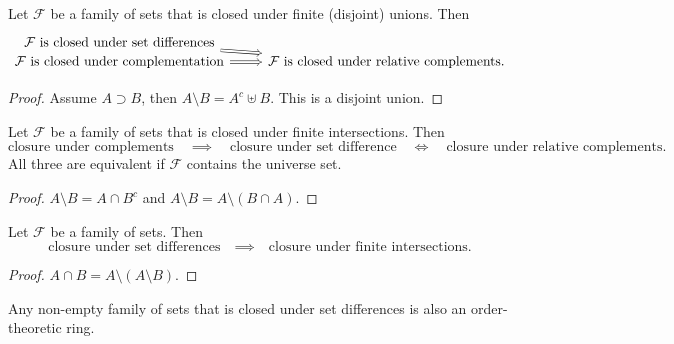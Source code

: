 \begin{lemma} \label{complementTypesUnionClosure}
Let $\mathcal{F}$ be a family of sets that is closed under finite (disjoint) unions. Then
\[ \begin{tikzcd}[row sep=0]
\text{$\mathcal{F}$ is closed under set differences} \arrow[dr, Rightarrow] & \\
\text{$\mathcal{F}$ is closed under complementation} \arrow[r,Rightarrow] & \text{$\mathcal{F}$ is closed under relative complements.}
\end{tikzcd} \]
\end{lemma}
\begin{proof}
Assume $A\supset B$, then $A\setminus B = A^c \uplus B$. This is a disjoint union.
\end{proof}

\begin{lemma}
Let $\mathcal{F}$ be a family of sets that is closed under finite intersections. Then
\[ \text{closure under complements} \quad\implies\quad \text{closure under set difference} \quad\iff\quad \text{closure under relative complements.} \]
All three are equivalent if $\mathcal{F}$ contains the universe set.
\end{lemma}
\begin{proof}
$A\setminus B = A\cap B^c$ and $A\setminus B = A\setminus (B\cap A)$.
\end{proof}

\begin{lemma} \label{closureSetDifference}
Let $\mathcal{F}$ be a family of sets. Then
\[ \text{closure under set differences} \quad\implies\quad \text{closure under finite intersections.} \]
\end{lemma}
\begin{proof}
$A\cap B = A\setminus (A\setminus B)$.
\end{proof}

Any non-empty family of sets that is closed under set differences is also an order-theoretic ring.

